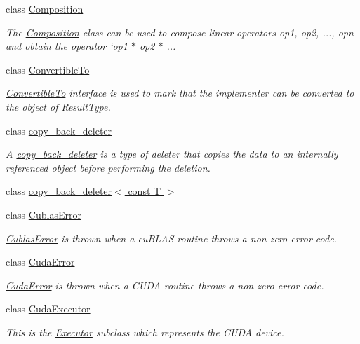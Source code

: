 \begin{DoxyCompactItemize}
class \hyperlink{classgko_1_1Composition}{Composition}
\begin{DoxyCompactList}\small\item\em The \hyperlink{classgko_1_1Composition}{Composition} class can be used to compose linear operators {\ttfamily op1, op2, ..., opn} and obtain the operator `op1 $\ast$ op2 $\ast$ ... \end{DoxyCompactList}\item 
class \hyperlink{classgko_1_1ConvertibleTo}{Convertible\+To}
\begin{DoxyCompactList}\small\item\em \hyperlink{classgko_1_1ConvertibleTo}{Convertible\+To} interface is used to mark that the implementer can be converted to the object of Result\+Type. \end{DoxyCompactList}\item 
class \hyperlink{classgko_1_1copy__back__deleter}{copy\+\_\+back\+\_\+deleter}
\begin{DoxyCompactList}\small\item\em A \hyperlink{classgko_1_1copy__back__deleter}{copy\+\_\+back\+\_\+deleter} is a type of deleter that copies the data to an internally referenced object before performing the deletion. \end{DoxyCompactList}\item 
class \hyperlink{classgko_1_1copy__back__deleter_3_01const_01T_01_4}{copy\+\_\+back\+\_\+deleter$<$ const T $>$}
\item 
class \hyperlink{classgko_1_1CublasError}{Cublas\+Error}
\begin{DoxyCompactList}\small\item\em \hyperlink{classgko_1_1CublasError}{Cublas\+Error} is thrown when a cu\+B\+L\+AS routine throws a non-\/zero error code. \end{DoxyCompactList}\item 
class \hyperlink{classgko_1_1CudaError}{Cuda\+Error}
\begin{DoxyCompactList}\small\item\em \hyperlink{classgko_1_1CudaError}{Cuda\+Error} is thrown when a C\+U\+DA routine throws a non-\/zero error code. \end{DoxyCompactList}\item 
class \hyperlink{classgko_1_1CudaExecutor}{Cuda\+Executor}
\begin{DoxyCompactList}\small\item\em This is the \hyperlink{classgko_1_1Executor}{Executor} subclass which represents the C\+U\+DA device. \end{DoxyCompactList}\item 

\end{DoxyCompactItemize}
